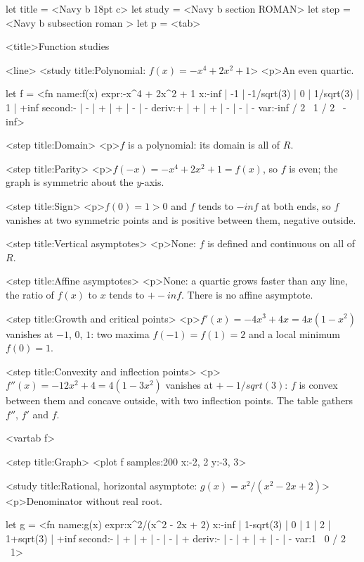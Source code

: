 \documentclass[margins=15, size=12, lang=en]{scholatex}
\begin{document}
let title = <Navy b 18pt c>
let study = <Navy b section ROMAN>
let step  = <Navy b subsection roman >
let p     = <tab>

<title>Function studies

<line>
<study title:{Polynomial: $f(x) = -x^4 + 2x^2 + 1$}>{
<p>An even quartic.
}

let f = <fn name:{f(x)}
            expr:{-x^4 + 2x^2 + 1}
            x:{-inf | -1 | -1/sqrt(3) | 0 | 1/sqrt(3) | 1 | +inf}
            second:{- | - | + | + | - | -}
            deriv:{+ | + | + | - | - | -}
            var:{-inf / 2 \ 1 / 2 \ -inf}>

<step title:{Domain}>{
<p>$f$ is a polynomial: its domain is all of $R$.
}

<step title:{Parity}>{
<p>$f(-x) = -x^4 + 2x^2 + 1 = f(x)$, so $f$ is even; the graph is
symmetric about the $y$-axis.
}

<step title:{Sign}>{
<p>$f(0) = 1 > 0$ and $f$ tends to $-inf$ at both ends, so $f$ vanishes
at two symmetric points and is positive between them, negative outside.
}

<step title:{Vertical asymptotes}>{
<p>None: $f$ is defined and continuous on all of $R$.
}

<step title:{Affine asymptotes}>{
<p>None: a quartic grows faster than any line, the ratio of $f(x)$ to $x$ tends to $+- inf$. There is no affine asymptote.
}

<step title:{Growth and critical points}>{
<p>$f'(x) = -4x^3 + 4x = 4x(1 - x^2)$ vanishes at $-1$, $0$, $1$: two
maxima $f(-1) = f(1) = 2$ and a local minimum $f(0) = 1$.
}

<step title:{Convexity and inflection points}>{
<p>$f''(x) = -12x^2 + 4 = 4(1 - 3x^2)$ vanishes at $+- 1/sqrt(3)$:
$f$ is convex between them and concave outside, with two inflection
points. The table gathers $f''$, $f'$ and $f$.
}

<vartab f>

<step title:{Graph}>{
<plot f samples:200 x:{-2, 2} y:{-3, 3}>
}

<study title:{Rational, horizontal asymptote: $g(x) = x^2/(x^2-2x+2)$}>{
<p>Denominator without real root.
}

let g = <fn name:{g(x)}
            expr:{x^2/(x^2 - 2x + 2)}
            x:{-inf | 1-sqrt(3) | 0 | 1 | 2 | 1+sqrt(3) | +inf}
            second:{- | + | + | - | - | +}
            deriv:{- | - | + | + | - | -}
            var:{1 \ 0 / 2 \ 1}>
\end{document}
